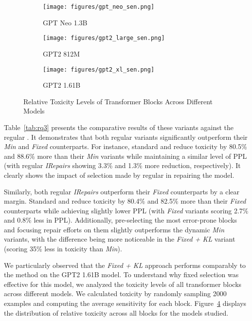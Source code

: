 \begin{figure}
\centering
\begin{subfigure}{.4\textwidth}
  \centering
  \texttt{[image: figures/gpt\_neo\_sen.png]}
  \caption{GPT Neo 1.3B}
  \label{fig:gpt2xl}
\end{subfigure}%
\begin{subfigure}{.4\textwidth}
  \centering
  \texttt{[image: figures/gpt2\_large\_sen.png]}
  \caption{GPT2 812M}
  \label{fig:gpt2large}
\end{subfigure}
\begin{subfigure}{.4\textwidth}
  \centering
  \texttt{[image: figures/gpt2\_xl\_sen.png]}
  \caption{GPT2 1.61B}
  \label{fig:gptneo}
\end{subfigure}
\caption{Relative Toxicity Levels of Transformer Blocks Across Different Models}
\label{fig:tox}
\end{figure}

Table~\ref{tab:rq3} presents the comparative results of these variants against the regular \nick. It demonstrates that both regular \nick variants significantly outperform their \textit{Min} and \textit{Fixed} counterparts. For instance, standard \nick and \nickkl reduce toxicity by 80.5\% and 88.6\% more than their \textit{Min} variants while maintaining a similar level of PPL (with regular \textit{IRepairs} showing 3.3\% and 1.3\% more reduction, respectively). It clearly shows the impact of selection made by regular \nick in repairing the model. 

Similarly, both regular \textit{IRepairs} outperform their \textit{Fixed} counterparts by a clear margin. Standard \nick and \nickkl reduce toxicity by 80.4\% and 82.5\% more than their \textit{Fixed} counterparts while achieving slightly lower PPL (with \textit{Fixed} variants scoring 2.7\% and 0.8\% less in PPL). Additionally, pre-selecting the most error-prone blocks and focusing repair efforts on them slightly outperforms the dynamic \textit{Min} variants, with the difference being more noticeable in the \textit{Fixed + KL} variant (scoring 35\% less in toxicity than \textit{Min}).

We particularly observed that the \textit{Fixed + KL} approach performs comparably to the \nickkl method on the GPT2 1.61B model. To understand why fixed selection was effective for this model, we analyzed the toxicity levels of all transformer blocks across different models. We calculated toxicity by randomly sampling 2000 examples and computing the average sensitivity for each block. Figure~\ref{fig:tox} displays the distribution of relative toxicity across all blocks for the models studied.

